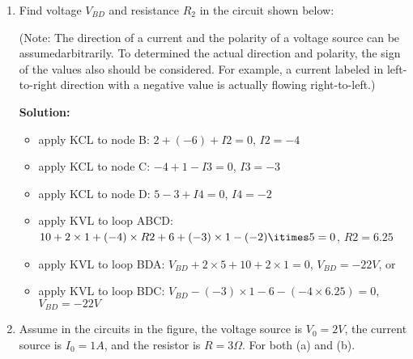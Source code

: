 \begin{enumerate}
\begin{enumerate}
\item What are required of the ammeter and the voltmeter to minimize their
	influences on the measurements? 

{\bf Solution:}
The ammeter should have minimum (ideally 0) impedance while the voltmeter
should have maximum (ideally infinity) impedance. 

\item How would the ammeter and the voltmeter affect the measurement of the
	current and the voltage in either of the configurations (a and b)?
\end{enumerate}

{\bf Solution:}
In (a) the voltmeter will by-pass some current so that the actual current
through the load is smaller than the reading of the ammeter; 

in (b) the ammeter will cause some voltage drop and the actual voltage 
across the load is lower than the reading of the voltmeter. 

\item Find voltage $V_{BD}$ and resistance $R_2$ in the circuit shown below:


(Note: The direction of a current and the polarity of a voltage source can
be assumedarbitrarily. To determined the actual direction and polarity, the
sign of the values also should be considered. For example, a current labeled 
in left-to-right direction with a negative value is actually flowing 
right-to-left.)

{\bf Solution:}
\begin{itemize}
\item apply KCL to node B: $2+(-6)+I2=0$, $I2=-4$ 
\item apply KCL to node C: $-4+1-I3=0$, $I3=-3$
\item apply KCL to node D: $5-3+I4=0$, $I4=-2$
\item apply KVL to loop ABCD: 
	$10+2\times 1+(-4)\times R2+6+(-3)\times 1-(-2)\itimes 5=0$, 
	$R2=6.25$
\item apply KVL to loop BDA: $V_{BD}+2\times 5+10+2\times 1=0$, 
	$V_{BD}=-22V$, or
\item apply KVL to loop BDC: $V_{BD}-(-3)\times 1-6-(-4\times 6.25)=0$, 
	$V_{BD}=-22V$
\end{itemize}

\item Assume in the circuits in the figure, the voltage source is $V_0=2V$,
	the current source is $I_0=1A$, and the resistor is $R=3\Omega$.
	For both (a) and (b).


\end{enumerate}
